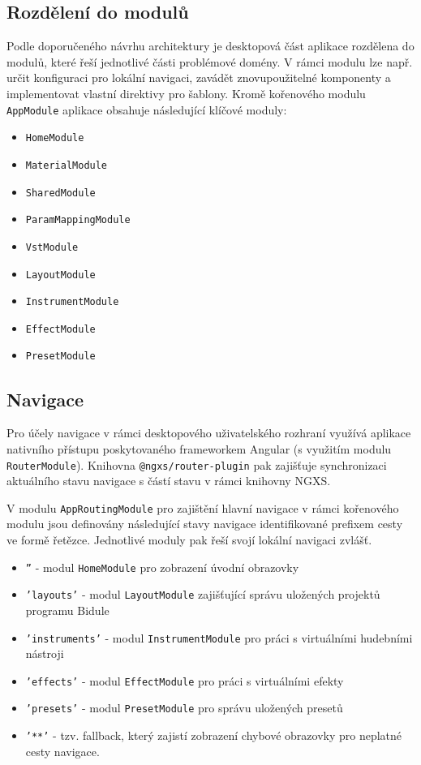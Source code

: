 \documentclass[thesis=M,czech]{FITthesis}[2019/03/06]
\begin{document}
		\subsection{Rozdělení do modulů}
			Podle doporučeného návrhu architektury je desktopová část aplikace rozdělena do modulů, které řeší jednotlivé části problémové domény\cite{ng-modules}.
			V rámci modulu lze např. určit konfiguraci pro lokální navigaci, zavádět znovupoužitelné komponenty a implementovat vlastní direktivy pro šablony.
			Kromě kořenového modulu \texttt{AppModule} aplikace obsahuje následující klíčové moduly:
			\begin{itemize}
				\item \texttt{HomeModule}
				\item \texttt{MaterialModule}
				\item \texttt{SharedModule}
				\item \texttt{ParamMappingModule}
				\item \texttt{VstModule}
				\item \texttt{LayoutModule}
				\item \texttt{InstrumentModule}
				\item \texttt{EffectModule}
				\item \texttt{PresetModule}
			\end{itemize}
		
		\subsection{Navigace}
			Pro účely navigace v rámci desktopového uživatelského rozhraní využívá aplikace nativního přístupu poskytovaného
			frameworkem Angular (s využitím modulu \texttt{RouterModule}).
			Knihovna \texttt{@ngxs/router-plugin} pak zajišťuje synchronizaci aktuálního stavu navigace s částí stavu v rámci knihovny NGXS.
			
			V modulu \texttt{AppRoutingModule} pro zajištění hlavní navigace v rámci kořenového modulu jsou definovány následující stavy navigace identifikované prefixem cesty ve formě řetězce. Jednotlivé moduly pak řeší svojí lokální navigaci zvlášť.
			\begin{itemize}
				\item \texttt{''} - modul \texttt{HomeModule} pro zobrazení úvodní obrazovky
				\item \texttt{'layouts'} - modul \texttt{LayoutModule} zajišťující správu uložených projektů programu Bidule
				\item \texttt{'instruments'} - modul \texttt{InstrumentModule} pro práci s virtuálními hudebními nástroji
				\item \texttt{'effects'} - modul \texttt{EffectModule} pro práci s virtuálními efekty
				\item \texttt{'presets'} - modul \texttt{PresetModule} pro správu uložených presetů
				\item \texttt{'**'} - tzv. fallback, který zajistí zobrazení chybové obrazovky pro neplatné cesty navigace.
			\end{itemize}		
		
\end{document}
